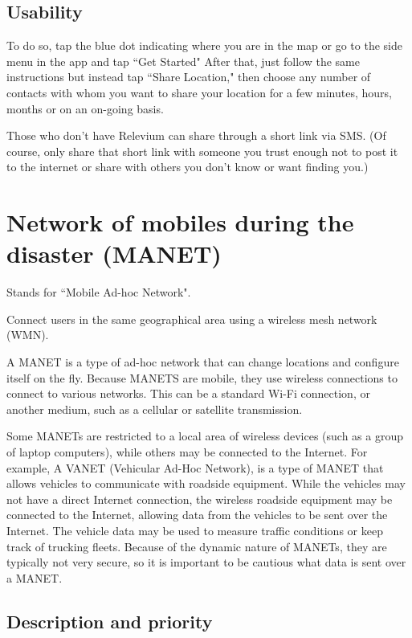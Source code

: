 \documentclass{scrreprt}
\begin{document}
\subsection{Usability}

To do so, tap the blue dot indicating where you are in the map or go to the side menu in the app and tap ``Get Started" After that, just follow the same instructions but instead tap ``Share Location," then choose any number of contacts with whom you want to share your location for a few minutes, hours, months or on an on-going basis.

Those who don’t have Relevium can share through a short link via SMS. (Of course, only share that short link with someone you trust enough not to post it to the internet or share with others you don’t know or want finding you.)


\section{Network of mobiles during the disaster (MANET)}

Stands for ``Mobile Ad-hoc Network".

Connect users in the same geographical area using a wireless mesh network (WMN).



A MANET is a type of ad-hoc network that can change locations and configure itself on the fly. Because MANETS are mobile, they use wireless connections to connect to various networks. This can be a standard Wi-Fi connection, or another medium, such as a cellular or satellite transmission.

Some MANETs are restricted to a local area of wireless devices (such as a group of laptop computers), while others may be connected to the Internet. For example, A VANET (Vehicular Ad-Hoc Network), is a type of MANET that allows vehicles to communicate with roadside equipment. While the vehicles may not have a direct Internet connection, the wireless roadside equipment may be connected to the Internet, allowing data from the vehicles to be sent over the Internet. The vehicle data may be used to measure traffic conditions or keep track of trucking fleets. Because of the dynamic nature of MANETs, they are typically not very secure, so it is important to be cautious what data is sent over a MANET.

\subsection{Description and priority}
\end{document}
